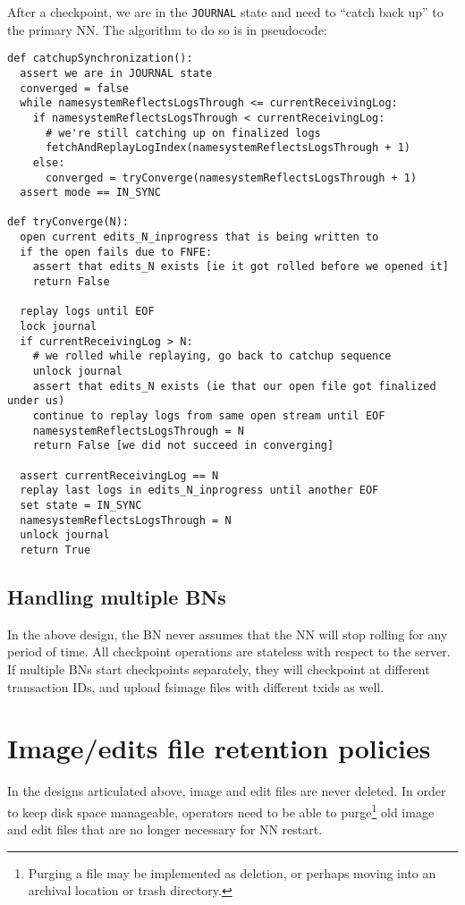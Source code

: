 \documentclass{article}
\begin{document}
After a checkpoint, we are in the {\tt JOURNAL} state and need to ``catch back up'' to the primary NN. The algorithm to do so is in pseudocode:
\label{catchupSynchronization}
\begin{verbatim}
def catchupSynchronization():
  assert we are in JOURNAL state
  converged = false
  while namesystemReflectsLogsThrough <= currentReceivingLog:
    if namesystemReflectsLogsThrough < currentReceivingLog:
      # we're still catching up on finalized logs
      fetchAndReplayLogIndex(namesystemReflectsLogsThrough + 1)
    else:
      converged = tryConverge(namesystemReflectsLogsThrough + 1)
  assert mode == IN_SYNC

def tryConverge(N):
  open current edits_N_inprogress that is being written to
  if the open fails due to FNFE:
    assert that edits_N exists [ie it got rolled before we opened it]
    return False

  replay logs until EOF
  lock journal
  if currentReceivingLog > N:
    # we rolled while replaying, go back to catchup sequence
    unlock journal
    assert that edits_N exists (ie that our open file got finalized under us)
    continue to replay logs from same open stream until EOF
    namesystemReflectsLogsThrough = N
    return False [we did not succeed in converging]

  assert currentReceivingLog == N
  replay last logs in edits_N_inprogress until another EOF
  set state = IN_SYNC
  namesystemReflectsLogsThrough = N
  unlock journal
  return True
\end{verbatim}

\subsection{Handling multiple BNs}

In the above design, the BN never assumes that the NN will stop rolling for any period of time. All checkpoint operations are stateless with respect to the server. If multiple BNs start checkpoints separately, they will checkpoint at different transaction IDs, and upload fsimage files with different txids as well.

\section{Image/edits file retention policies}

In the designs articulated above, image and edit files are never deleted. In order to keep disk space manageable, operators need to be able to purge\footnote{Purging a file may be implemented as deletion, or perhaps moving into an archival location or trash directory.} old image and edit files that are no longer necessary for NN restart.
\end{document}
